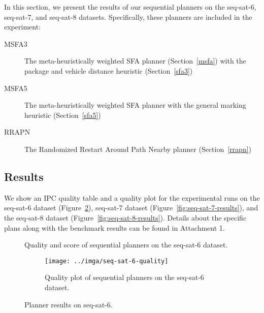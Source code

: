 In this section, we present the results of our sequential planners on the seq-sat-6, seq-sat-7, and seq-sat-8 datasets. Specifically, these planners are included in the experiment:
\begin{description}
\item[MSFA3] The meta-heuristically weighted SFA planner (Section~\ref{msfa}) with the package and vehicle distance heuristic (Section~\ref{sfa3})
\item[MSFA5] The meta-heuristically weighted SFA planner with the general marking heuristic (Section~\ref{sfa5})
\item[RRAPN] The Randomized Restart Around Path Nearby planner (Section~\ref{rrapn})
\end{description}

\subsection{Results}\label{sequential-results}

We show an IPC quality table and a quality plot
for the experimental runs on the seq-sat-6 dataset (Figure~\ref{fig:seq-sat-6-results}), seq-sat-7 dataset (Figure~\ref{fig:seq-sat-7-results}), and the seq-sat-8 dataset (Figure~\ref{fig:seq-sat-8-results}). Details about the specific plans along with the benchmark results can be found in Attachment 1.

\begin{figure}[tbp]
\centering
\begin{subtable}{\textwidth}
\centering
\scriptsize
\renewcommand{\footnotesize}{\scriptsize}

\caption{Quality and score of sequential planners on the seq-sat-6 dataset.}
\label{tab:seq-sat-6-ipc-scores}
\end{subtable}

\vspace{0.5cm}
\begin{subfigure}{\textwidth}
\centering
\texttt{[image: ../imga/seq-sat-6-quality]}
\caption{Quality plot of sequential planners on the seq-sat-6 dataset.}
\label{fig:seq-sat-6-quality}
\end{subfigure}
\caption{Planner results on seq-sat-6.}
\label{fig:seq-sat-6-results}
\end{figure}


